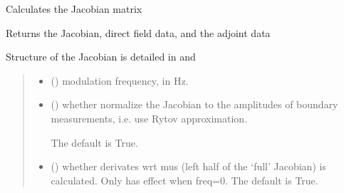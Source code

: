 \documentclass[letterpaper,10pt,english]{sphinxmanual}
\begin{document}
\begin{fulllineitems}
\begin{fulllineitems}
\label{\detokenize{_autosummary/nirfasterff.base.stnd_mesh.stndmesh:nirfasterff.base.stnd_mesh.stndmesh.jacobian}}
\pysigstartsignatures
\pysiglinewithargsret
{}
{\sphinxparamcomma {}\sphinxparamcomma {}\sphinxparamcomma {}\sphinxparamcomma {}}
{}
\pysigstopsignatures
\sphinxAtStartPar
Calculates the Jacobian matrix

\sphinxAtStartPar
Returns the Jacobian, direct field data, and the adjoint data

\sphinxAtStartPar
Structure of the Jacobian is detailed in {\hyperref[\detokenize{_autosummary/nirfasterff.inverse.jacobian_stnd_CW:nirfasterff.inverse.jacobian_stnd_CW}]{}} and {\hyperref[\detokenize{_autosummary/nirfasterff.inverse.jacobian_stnd_FD:nirfasterff.inverse.jacobian_stnd_FD}]{}}
\begin{quote}\begin{description}
\begin{itemize}
\item {} 
\sphinxAtStartPar
{} () \textendash{} modulation frequency, in Hz.

\item {} 
\sphinxAtStartPar
{} (\sphinxstyleliteralemphasis{\sphinxupquote{, }}) \textendash{} 
\sphinxAtStartPar
whether normalize the Jacobian to the amplitudes of boundary measurements, i.e. use Rytov approximation.

\sphinxAtStartPar
The default is True.


\item {} 
\sphinxAtStartPar
{} (\sphinxstyleliteralemphasis{\sphinxupquote{, }}) \textendash{} whether derivates wrt mus (left half of the ‘full’ Jacobian) is calculated. Only has effect when freq=0. The default is True.


\end{itemize}
\end{description}
\end{quote}
\end{fulllineitems}
\end{fulllineitems}
\end{document}
